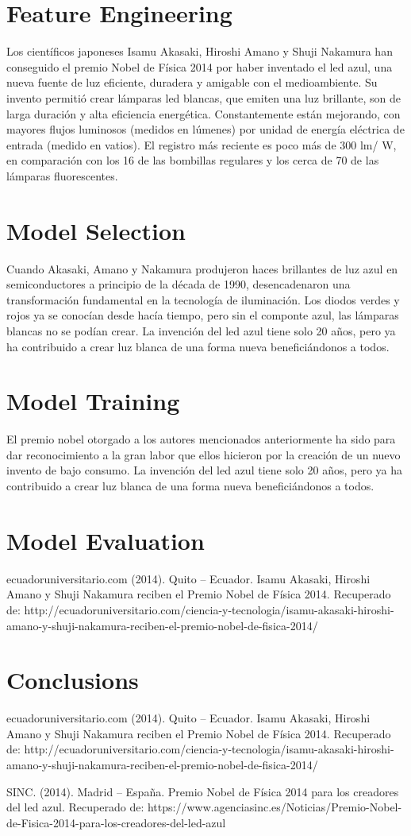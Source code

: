 \documentclass{article}
\begin{document}
\section{Feature Engineering}
Los científicos japoneses Isamu Akasaki, Hiroshi Amano y Shuji Nakamura han conseguido el premio Nobel de Física 2014 por haber inventado el led azul, una nueva fuente de luz eficiente, duradera y amigable con el medioambiente. 
Su invento permitió crear lámparas led blancas, que emiten una luz brillante, son de larga duración y alta eficiencia energética. Constantemente están mejorando, con mayores flujos luminosos (medidos en lúmenes) por unidad de energía eléctrica de entrada (medido en vatios). El registro más reciente es poco más de 300 lm/ W, en comparación con los 16 de las bombillas regulares y los cerca de 70 de las lámparas fluorescentes.

\section{Model Selection}
Cuando Akasaki, Amano y Nakamura produjeron haces brillantes de luz azul en semiconductores a principio de la década de 1990, desencadenaron una transformación fundamental en la tecnología de iluminación. Los diodos verdes y rojos ya se conocían desde hacía tiempo, pero sin el componte azul, las lámparas blancas no se podían crear. La invención del led azul tiene solo 20 años, pero ya ha contribuido a crear luz blanca de una forma nueva beneficiándonos a todos.

\section{Model Training}
El premio nobel otorgado a los autores mencionados anteriormente ha sido para dar reconocimiento a la gran labor que ellos hicieron por la creación de un nuevo invento de bajo consumo. La invención del led azul tiene solo 20 años, pero ya ha contribuido a crear luz blanca de una forma nueva beneficiándonos a todos.

\section{Model Evaluation}
ecuadoruniversitario.com  (2014). Quito – Ecuador. Isamu Akasaki, Hiroshi Amano y Shuji Nakamura reciben el Premio Nobel de Física 2014. Recuperado de: http://ecuadoruniversitario.com/ciencia-y-tecnologia/isamu-akasaki-hiroshi-amano-y-shuji-nakamura-reciben-el-premio-nobel-de-fisica-2014/

\section{Conclusions}
ecuadoruniversitario.com  (2014). Quito – Ecuador. Isamu Akasaki, Hiroshi Amano y Shuji Nakamura reciben el Premio Nobel de Física 2014. Recuperado de: http://ecuadoruniversitario.com/ciencia-y-tecnologia/isamu-akasaki-hiroshi-amano-y-shuji-nakamura-reciben-el-premio-nobel-de-fisica-2014/

SINC. (2014). Madrid – España. Premio Nobel de Física 2014 para los creadores del led azul. Recuperado de: https://www.agenciasinc.es/Noticias/Premio-Nobel-de-Fisica-2014-para-los-creadores-del-led-azul 
\end{document}
